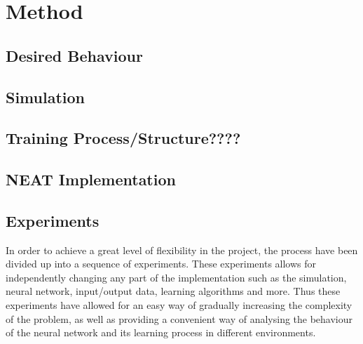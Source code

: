 
\chapter{Method}

\section{Desired Behaviour}

\section{Simulation}

\section{Training Process/Structure????}

\section{NEAT Implementation}

\section{Experiments}
In order to achieve a great level of flexibility in the project, the process have been divided up into a sequence of experiments. These experiments allows for independently changing any part of the implementation such as the simulation, neural network, input/output data, learning algorithms and more. Thus these experiments have allowed for an easy way of gradually increasing the complexity of the problem, as well as providing a convenient way of analysing the behaviour of the neural network and its learning process in different environments.


